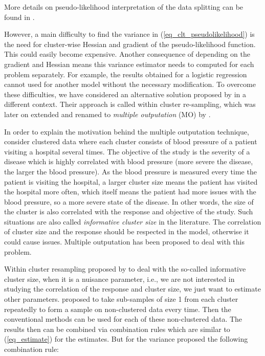 \documentclass[11pt,a5paper,twoside]{book}
\begin{document}
More details on pseudo-likelihood interpretation of the data splitting can be found in \cite{Iddi2011}. 

However, a main difficulty to find the variance in (\ref{eq_clt_pseudolikelihood}) is the need for cluster-wise Hessian and gradient of the pseudo-likelihood function. This could easily become expensive. Another consequence of depending on the gradient and Hessian means this variance estimator needs to computed for each problem separately. For example, the results obtained for a logistic regression cannot used for another model without the necessary modification. To overcome these difficulties, we have considered an alternative solution proposed by \cite{hoffman2001} in a different context. Their approach is called within cluster re-sampling, which was later on extended and renamed to \emph{multiple outputation} (MO) by \cite{follmann2003}.

In order to explain the motivation behind the multiple outputation technique, consider clustered data where each cluster consists of blood pressure of a patient visiting a hospital several times. The objective of the study is the severity of a disease which is highly correlated with blood pressure (more severe the disease, the larger the blood pressure). As the blood pressure is measured every time the patient is visiting the hospital, a larger cluster size means the patient has visited the hospital more often, which itself means the patient had more issues with the blood pressure, so a more severe state of the disease. In other words, the size of the cluster is also correlated with the response and objective of the study. Such situations are also called \emph{informative cluster size} in the literature. The correlation of cluster size and the response should be respected in the model, otherwise it could cause issues. Multiple outputation has been proposed to deal with this problem.

Within cluster resampling proposed by \cite{hoffman2001} to deal with the so-called informative cluster size, when it is a nuisance parameter, i.e., we are not interested in studying the correlation of the response and cluster size, we just want to estimate other parameters. \cite{hoffman2001} proposed to take sub-samples of size 1 from each cluster repeatedly to form a sample on non-clustered data every time. Then the conventional methods can be used for each of these non-clustered data. The results then can be combined via combination rules which are similar to (\ref{eq_estimate}) for the estimates. But for the variance \cite{hoffman2001} proposed the following combination rule:
\end{document}
